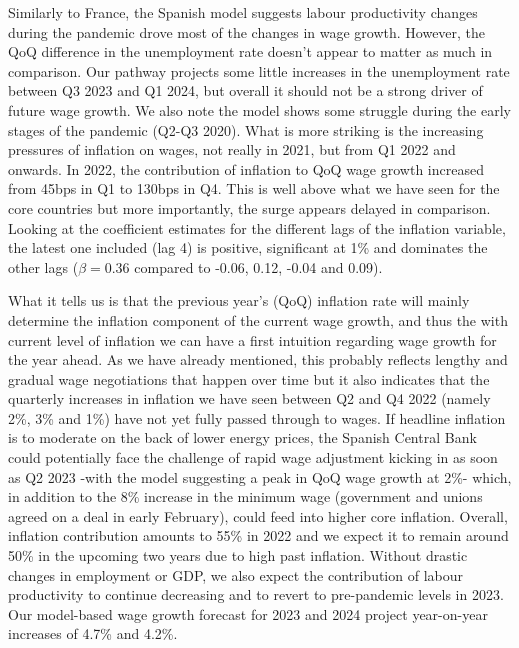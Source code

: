 Similarly to France, the Spanish model suggests labour productivity changes during the pandemic drove most of the changes in wage growth. 
However, the QoQ difference in the unemployment rate doesn’t appear to matter as much in comparison. 
Our pathway projects some little increases in the unemployment rate between Q3 2023 and Q1 2024, but overall it should not be a strong driver of future wage growth. 
We also note the model shows some struggle during the early stages of the pandemic (Q2-Q3 2020). 
What is more striking is the increasing pressures of inflation on wages, not really in 2021, but from Q1 2022 and onwards. 
In 2022, the contribution of inflation to QoQ wage growth increased from 45bps in Q1 to 130bps in Q4. 
This is well above what we have seen for the core countries but more importantly, the surge appears delayed in comparison. 
Looking at the coefficient estimates for the different lags of the inflation variable, the latest one included (lag 4) is positive, significant at 1\% and dominates the other lags ($\beta = 0.36$ compared to -0.06, 0.12, -0.04 and 0.09). 

What it tells us is that the previous year's (QoQ) inflation rate will mainly determine the inflation component of the current wage growth, and thus the with current level of inflation we can have a first intuition regarding wage growth for the year ahead. 
As we have already mentioned, this probably reflects lengthy and gradual wage negotiations that happen over time but it also indicates that the quarterly increases in inflation we have seen between Q2 and Q4 2022 (namely 2\%, 3\% and 1\%) have not yet fully passed through to wages. 
If headline inflation is to moderate on the back of lower energy prices, the Spanish Central Bank could potentially face the challenge of rapid wage adjustment kicking in as soon as Q2 2023 -with the model suggesting a peak in QoQ wage growth at 2\%- which, in addition to the 8\% increase in the minimum wage (government and unions agreed on a deal in early February), could feed into higher core inflation. 
Overall, inflation contribution amounts to 55\% in 2022 and we expect it to remain around 50\% in the upcoming two years due to high past inflation. 
Without drastic changes in employment or GDP, we also expect the contribution of labour productivity to continue decreasing and to revert to pre-pandemic levels in 2023. 
Our model-based wage growth forecast for 2023 and 2024 project year-on-year increases of 4.7\% and 4.2\%.

